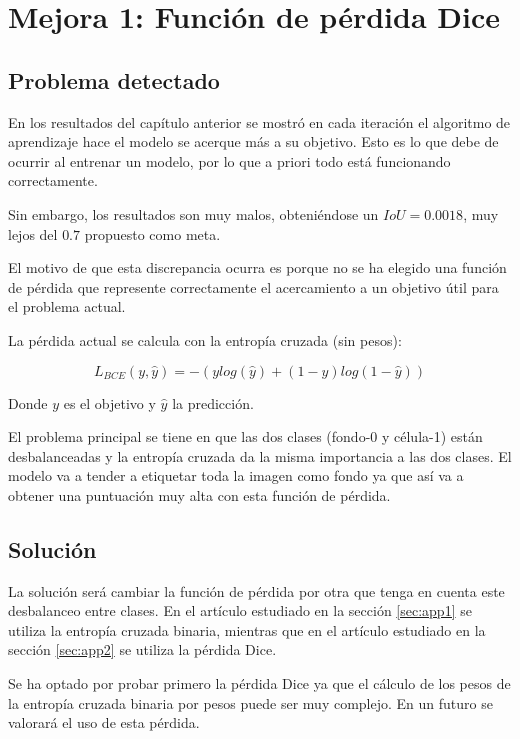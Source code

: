 \chapter{Mejora 1: Función de pérdida Dice}\label{loss_function}

\section{Problema detectado}\label{sec:loss_function_problem}

En los resultados del capítulo anterior se mostró en cada iteración el algoritmo de aprendizaje hace el modelo se acerque más a su objetivo. Esto es lo que debe de ocurrir al entrenar un modelo, por lo que a priori todo está funcionando correctamente.

Sin embargo, los resultados son muy malos, obteniéndose un $IoU=0.0018$, muy lejos del $0.7$ propuesto como meta.

El motivo de que esta discrepancia ocurra es porque no se ha elegido una función de pérdida que represente correctamente el acercamiento a un objetivo útil para el problema actual.

La pérdida actual se calcula con la entropía cruzada (sin pesos):

\begin{equation}
L_{BCE}(y,\hat{y})=-(y log(\hat{y}) + (1-y)log(1-\hat{y}))
\end{equation}

Donde $y$ es el objetivo y $\hat{y}$ la predicción.

El problema principal se tiene en que las dos clases (fondo-0 y célula-1) están desbalanceadas y la entropía cruzada da la misma importancia a las dos clases. El modelo va a tender a etiquetar toda la imagen como fondo ya que así va a obtener una puntuación muy alta con esta función de pérdida.

\section{Solución}\label{sec:loss_function_change}

La solución será cambiar la función de pérdida por otra que tenga en cuenta este desbalanceo entre clases. En el artículo estudiado en la sección \ref{sec:app1} se utiliza la entropía cruzada binaria, mientras que en el artículo estudiado en la sección \ref{sec:app2} se utiliza la pérdida Dice.

Se ha optado por probar primero la pérdida Dice ya que el cálculo de los pesos de la entropía cruzada binaria por pesos puede ser muy complejo. En un futuro se valorará el uso de esta pérdida.


